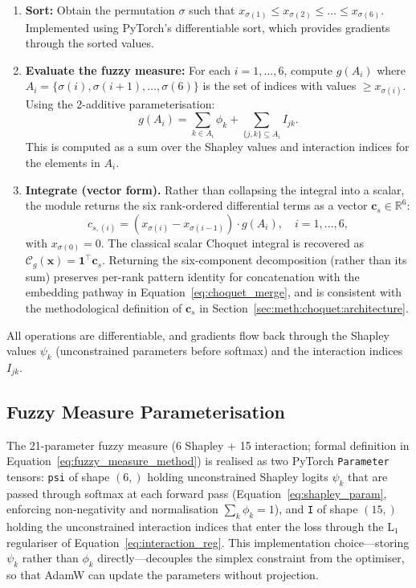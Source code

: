 \begin{enumerate}
    \item \textbf{Sort:} Obtain the permutation $\sigma$ such that $x_{\sigma(1)} \leq x_{\sigma(2)} \leq \ldots \leq x_{\sigma(6)}$. Implemented using PyTorch's differentiable sort, which provides gradients through the sorted values.

    \item \textbf{Evaluate the fuzzy measure:} For each $i = 1, \ldots, 6$, compute $g(A_i)$ where $A_i = \{\sigma(i), \sigma(i+1), \ldots, \sigma(6)\}$ is the set of indices with values $\geq x_{\sigma(i)}$. Using the 2-additive parameterisation:
    \begin{equation*}
        g(A_i) = \sum_{k \in A_i} \phi_k + \sum_{\{j,k\} \subseteq A_i} I_{jk}.
    \end{equation*}
    This is computed as a sum over the Shapley values and interaction indices for the elements in $A_i$.

    \item \textbf{Integrate (vector form).}
    Rather than collapsing the integral into a scalar, the module
    returns the six rank-ordered differential terms as a vector
    $\mathbf{c}_s \in \mathbb{R}^6$:
    \begin{equation}
    \label{eq:choquet_integral_impl}
        c_{s,(i)} = (x_{\sigma(i)} - x_{\sigma(i-1)}) \cdot g(A_i),
        \quad i = 1, \ldots, 6,
    \end{equation}
    with $x_{\sigma(0)} = 0$.
    The classical scalar Choquet integral is recovered as
    $\mathcal{C}_g(\mathbf{x}) = \mathbf{1}^\top \mathbf{c}_s$.
    Returning the six-component decomposition (rather than its sum)
    preserves per-rank pattern identity for concatenation with the
    embedding pathway in
    Equation~\ref{eq:choquet_merge}, and is consistent with the
    methodological definition of $\mathbf{c}_s$ in
    Section~\ref{sec:meth:choquet:architecture}.
\end{enumerate}

All operations are differentiable, and gradients flow back through the Shapley values $\psi_k$ (unconstrained parameters before softmax) and the interaction indices $I_{jk}$.

\subsection{Fuzzy Measure Parameterisation}
\label{sec:impl:choquet:measure}

The 21-parameter fuzzy measure (6 Shapley + 15 interaction;
formal definition in Equation~\ref{eq:fuzzy_measure_method}) is
realised as two PyTorch \texttt{Parameter} tensors:
\texttt{psi} of shape $(6,)$ holding unconstrained Shapley logits
$\psi_k$ that are passed through softmax at each forward pass
(Equation~\ref{eq:shapley_param}, enforcing non-negativity and
normalisation $\sum_k \phi_k = 1$), and \texttt{I} of shape $(15,)$
holding the unconstrained interaction indices that enter the loss
through the L$_1$ regulariser of Equation~\ref{eq:interaction_reg}.
This implementation choice---storing $\psi_k$ rather than $\phi_k$
directly---decouples the simplex constraint from the optimiser, so
that AdamW can update the parameters without projection.

